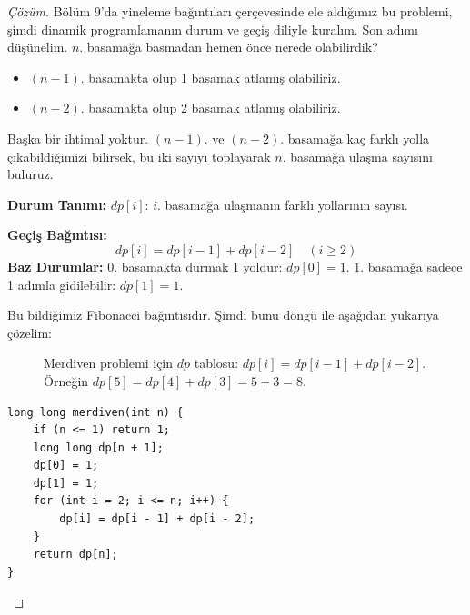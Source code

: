 \begin{proof}[Çözüm]
Bölüm 9'da yineleme bağıntıları çerçevesinde ele aldığımız bu problemi, şimdi dinamik programlamanın durum ve geçiş diliyle kuralım.
Son adımı düşünelim. $n$. basamağa basmadan hemen önce nerede olabilirdik?
\begin{itemize}
    \item $(n-1)$. basamakta olup 1 basamak atlamış olabiliriz.
    \item $(n-2)$. basamakta olup 2 basamak atlamış olabiliriz.
\end{itemize}
Başka bir ihtimal yoktur. $(n-1)$. ve $(n-2)$. basamağa kaç farklı yolla çıkabildiğimizi bilirsek, bu iki sayıyı toplayarak $n$. basamağa ulaşma sayısını buluruz.

\textbf{Durum Tanımı:}
$dp[i]$: $i$. basamağa ulaşmanın farklı yollarının sayısı.

\textbf{Geçiş Bağıntısı:}
\[
dp[i] = dp[i-1] + dp[i-2] \quad (i \ge 2)
\]
\textbf{Baz Durumlar:}
$0$. basamakta durmak 1 yoldur: $dp[0] = 1$.
$1$. basamağa sadece 1 adımla gidilebilir: $dp[1] = 1$.

Bu bildiğimiz Fibonacci bağıntısıdır. Şimdi bunu döngü ile aşağıdan yukarıya çözelim:

\begin{figure}[ht]
\centering
{}
\caption{Merdiven problemi için $dp$ tablosu: $dp[i] = dp[i-1] + dp[i-2]$.
Örneğin $dp[5] = dp[4] + dp[3] = 5 + 3 = 8$.}
\end{figure}

\begin{lstlisting}[language=CTemel]
long long merdiven(int n) {
    if (n <= 1) return 1;
    long long dp[n + 1];
    dp[0] = 1;
    dp[1] = 1;
    for (int i = 2; i <= n; i++) {
        dp[i] = dp[i - 1] + dp[i - 2];
    }
    return dp[n];
}
\end{lstlisting}


\end{proof}
